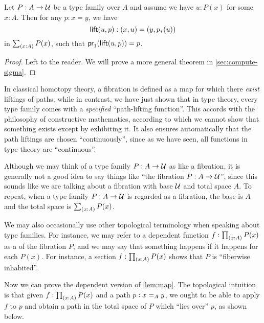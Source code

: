 \begin{lem}
    \label{thm:path-lifting}
    Let $P:A\to\type$ be a type family over $A$ and assume we have $u:P(x)$ for some $x:A$.
    Then for any $p:x=y$, we have
    \begin{equation*}
        \mathsf{lift}(u,p):(x,u)=(y,\trans{p}{u})
    \end{equation*}
    in $\sm{x:A}P(x)$, such that $\ap{\proj1}{\mathsf{lift}(u,p)} = p$.
\end{lem}
\begin{proof}
    Left to the reader.
    We will prove a more general theorem in \cref{sec:compute-sigma}.
\end{proof}

In classical homotopy theory, a fibration is defined as a map for which there \emph{exist} liftings of paths; while in contrast, we have just shown that in type theory, every type family comes with a \emph{specified} ``path-lifting function''.
This accords with the philosophy of constructive mathematics, according to which we cannot show that something exists except by exhibiting it.
%
It also ensures automatically that the path liftings are chosen ``continuously'', since as we have seen, all functions in type theory are ``continuous''.

\begin{rmk}
    Although we may think of a type family $P:A\to \type$ as like a fibration, it is generally not a good idea to say things like ``the fibration $P:A\to\type$'', since this sounds like we are talking about a fibration with base $\type$ and total space $A$.
    To repeat, when a type family $P:A\to \type$ is regarded as a fibration, the base is $A$ and the total space is $\sm{x:A} P(x)$.

    We may also occasionally use other topological terminology when speaking about type families.
    For instance, we may refer to a dependent function $f:\prd{x:A} P(x)$ as a 
    of the fibration $P$, and we may say that something happens 
    if it happens for each $P(x)$.
    For instance, a section $f:\prd{x:A} P(x)$ shows that $P$ is ``fiberwise inhabited''.
\end{rmk}

Now we can prove the dependent version of \cref{lem:map}.
The topological intuition is that given $f:\prd{x:A} P(x)$ and a path $p:\id[A]xy$, we ought to be able to apply $f$ to $p$ and obtain a path in the total space of $P$ which ``lies over'' $p$, as shown below.

